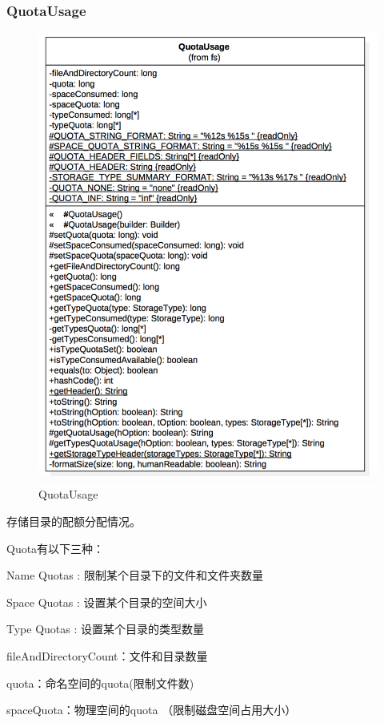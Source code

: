 \subsubsection{QuotaUsage}
\begin{figure}
\centering
\includegraphics[width =1\linewidth]{uml/outputstream/8.png}
\caption{QuotaUsage}
\label{fig:QuotaUsage}
\end{figure}

存储目录的配额分配情况。

Quota有以下三种：

Name Quotas : 限制某个目录下的文件和文件夹数量

Space Quotas : 设置某个目录的空间大小

Type Quotas : 设置某个目录的类型数量

fileAndDirectoryCount：文件和目录数量

quota：命名空间的quota(限制文件数)

spaceQuota：物理空间的quota （限制磁盘空间占用大小）

